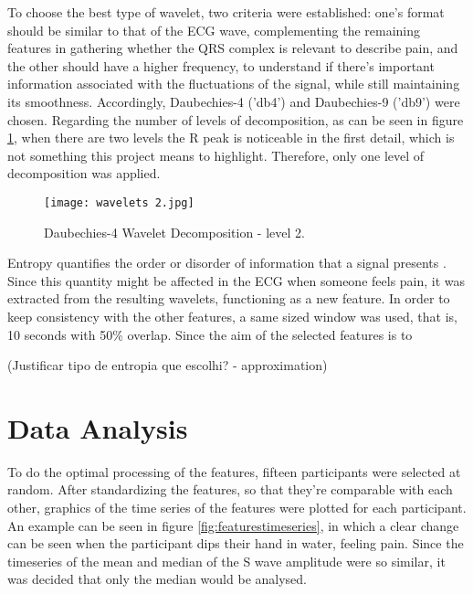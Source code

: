 To choose the best type of wavelet, two criteria were established: one's format should be similar to that of the ECG wave, complementing the remaining features in gathering whether the QRS complex is relevant to describe pain, and the other should have a higher frequency, to understand if there's important information associated with the fluctuations of the signal, while still maintaining its smoothness.
Accordingly, Daubechies-4 ('db4') and Daubechies-9 ('db9') were chosen.
Regarding the number of levels of decomposition, as can be seen in figure \ref{fig:wavelets2}, when there are two levels the R peak is noticeable in the first detail, which is not something this project means to highlight.
Therefore, only one level of decomposition was applied.

\begin{figure}[h!]
    \centering
    \texttt{[image: wavelets 2.jpg]}
    \caption{Daubechies-4 Wavelet Decomposition - level 2.}
    \label{fig:wavelets2}
\end{figure}

Entropy quantifies the order or disorder of information that a signal presents \cite{Ferreira2017}. Since this quantity might be affected in the ECG when someone feels pain, it was extracted from the resulting wavelets, functioning as a new feature. In order to keep consistency with the other features, a same sized window was used, that is, 10 seconds with 50\% overlap. Since the aim of the selected features is to 



(Justificar tipo de entropia que escolhi? - approximation)






\section{Data Analysis}
To do the optimal processing of the features, fifteen participants were selected at random. After standardizing the features, so that they're comparable with each other, graphics of the time series of the features were plotted for each participant. An example can be seen in figure \ref{fig:featurestimeseries}, in which a clear change can be seen when the participant dips their hand in water, feeling pain. Since the timeseries of the mean and median of the S wave amplitude were so similar, it was decided that only the median would be analysed.


